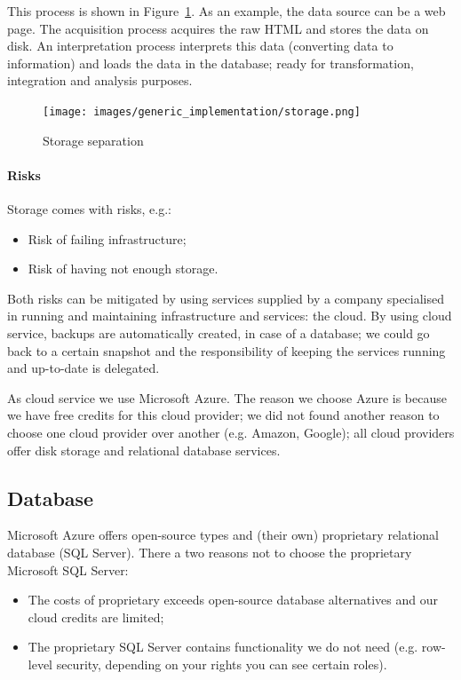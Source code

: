 \documentclass{ou-report}
\begin{document}
This process is shown in Figure~\ref{fig:storage_separation}. As an example, the data 
source can be a web page. The acquisition process acquires the raw HTML and stores the
data on disk. An interpretation process interprets this data (converting data to 
information) and loads the data in the database; ready for transformation, integration
and analysis purposes.

\begin{figure}[H]
\centering
\texttt{[image: images/generic\_implementation/storage.png]}
\caption{Storage separation}
\label{fig:storage_separation}
\end{figure}

\newpage
\paragraph{Risks}
Storage comes with risks, e.g.:
\begin{itemize}
\item Risk of failing infrastructure;
\item Risk of having not enough storage.
\end{itemize}

Both risks can be mitigated by using services supplied by a company specialised
in running and maintaining infrastructure and services: the cloud. By using
cloud service, backups are automatically created, in case of a database; we
could go back to a certain snapshot and the responsibility of keeping the 
services running and up-to-date is delegated. 

As cloud service we use Microsoft Azure. The reason we choose Azure is because
we have free credits for this cloud provider; we did not found another reason to
choose one cloud provider over another (e.g. Amazon, Google); all cloud 
providers offer disk storage and relational database services.

\subsection{Database}
Microsoft Azure offers open-source types and (their own) proprietary 
relational database (SQL Server). There a two reasons not to choose the 
proprietary Microsoft SQL Server:
\begin{itemize}
    \item The costs of proprietary exceeds open-source database alternatives and
    our cloud credits are limited;
    \item The proprietary SQL Server contains functionality we do not need (e.g.
    row-level security, depending on your rights you can see certain roles).
\end{itemize}
\end{document}
